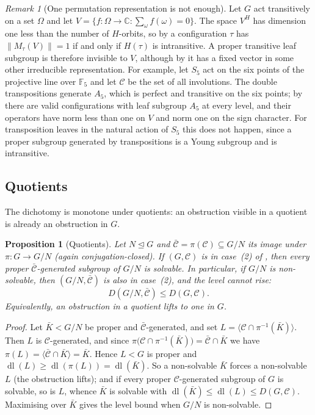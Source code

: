 \documentclass[11pt]{amsart}
\newtheorem{proposition}[proposition]{Proposition}
\theoremstyle{definition}
\theoremstyle{remark}
\newtheorem{remark}[remark]{Remark}
\theoremstyle{plain}
\theoremstyle{plain}
\numberwithin{equation}{section}
\newcommand{\norm}[1]{\lVert #1 \rVert}
\newcommand{\opn}[1]{\norm{#1}}
\newcommand{\F}{\mathbb{F}}
\newcommand{\C}{\mathbb{C}}
\begin{document}
\begin{remark}[One permutation representation is not enough]
\label{rem:std}
Let $G$ act transitively on a set $\Omega$ and let
$V=\{f\colon\Omega\to\C:\sum_\omega f(\omega)=0\}$. The space $V^H$ has
dimension one less than the number of $H$-orbits, so by 
a configuration $\tau$ has $\opn{M_\tau(V)}=1$ if and only if $H(\tau)$
is intransitive. A proper transitive leaf subgroup is therefore
invisible to $V$, although by  it has a fixed vector
in some other irreducible representation. For example, let $S_5$ act on
the six points of the projective line over $\F_5$ and let $\mathcal C$
be the set of all involutions. The double transpositions generate $A_5$,
which is perfect and transitive on the six points; by 
there are valid configurations with leaf subgroup $A_5$ at every level,
and their operators have norm less than one on $V$ and norm one on
the sign character. For
transposition leaves in the natural action of $S_5$ this does not
happen, since a proper subgroup generated by transpositions is a Young
subgroup and is intransitive.
\end{remark}

\subsection{Quotients}

The dichotomy is monotone under quotients: an obstruction visible in a
quotient is already an obstruction in $G$.

\begin{proposition}[Quotients]
\label{prop:quotient}
Let $N\trianglelefteq G$ and $\bar{\mathcal C}=\pi(\mathcal C)\subseteq G/N$ its image under
$\pi:G\to G/N$ (again conjugation-closed). If $(G,\mathcal C)$ is in case~\textup{(2)} of
, then every proper $\bar{\mathcal C}$-generated subgroup of $G/N$ is
solvable. In particular, if $G/N$ is non-solvable, then $(G/N,\bar{\mathcal C})$ is also in
case~\textup{(2)}, and the level cannot rise:
\[
D(G/N,\bar{\mathcal C})\le D(G,\mathcal C).
\]
Equivalently, an obstruction in a quotient lifts to one in $G$.
\end{proposition}
\begin{proof}
Let $\bar K<G/N$ be proper and $\bar{\mathcal C}$-generated, and set
$L=\langle\mathcal C\cap\pi^{-1}(\bar K)\rangle$. Then $L$ is $\mathcal C$-generated, and since
$\pi\bigl(\mathcal C\cap\pi^{-1}(\bar K)\bigr)=\bar{\mathcal C}\cap\bar K$ we have
$\pi(L)=\langle\bar{\mathcal C}\cap\bar K\rangle=\bar K$. Hence $L<G$ is proper and
$\operatorname{dl}(L)\ge\operatorname{dl}(\pi(L))=\operatorname{dl}(\bar K)$. So a non-solvable
$\bar K$ forces a non-solvable $L$ (the obstruction lifts); and if every proper $\mathcal
C$-generated subgroup of $G$ is solvable, so is $L$, whence $\bar K$ is solvable with
$\operatorname{dl}(\bar K)\le\operatorname{dl}(L)\le D(G,\mathcal C)$. Maximising over $\bar K$
gives the level bound when $G/N$ is non-solvable.
\end{proof}
\end{document}
